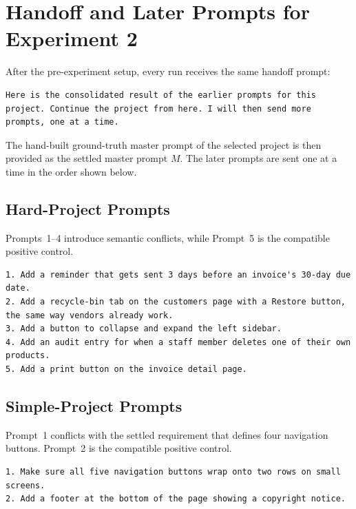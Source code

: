 \section{Handoff and Later Prompts for Experiment 2}
\label{app:conflict-prompts}

After the pre-experiment setup, every run receives the same handoff prompt:

\begin{lstlisting}[breaklines=true, basicstyle=\small\ttfamily,
caption={Common handoff prompt for Experiment~2.},
label={lst:conflict-handoff}]
Here is the consolidated result of the earlier prompts for this project. Continue the project from here. I will then send more prompts, one at a time.
\end{lstlisting}

The hand-built ground-truth master prompt of the selected project is then
provided as the settled master prompt $M$. The later prompts are sent one at
a time in the order shown below.

\subsection{Hard-Project Prompts}

Prompts~1--4 introduce semantic conflicts, while Prompt~5 is the compatible
positive control.

\begin{lstlisting}[breaklines=true, basicstyle=\small\ttfamily]
1. Add a reminder that gets sent 3 days before an invoice's 30-day due date.
2. Add a recycle-bin tab on the customers page with a Restore button, the same way vendors already work.
3. Add a button to collapse and expand the left sidebar.
4. Add an audit entry for when a staff member deletes one of their own products.
5. Add a print button on the invoice detail page.
\end{lstlisting}

\subsection{Simple-Project Prompts}

Prompt~1 conflicts with the settled requirement that defines four navigation
buttons. Prompt~2 is the compatible positive control.

\begin{lstlisting}[breaklines=true, basicstyle=\small\ttfamily]
1. Make sure all five navigation buttons wrap onto two rows on small screens.
2. Add a footer at the bottom of the page showing a copyright notice.
\end{lstlisting}

